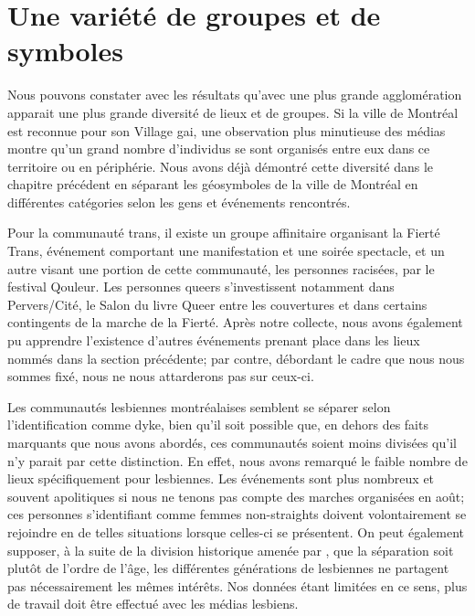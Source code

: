 \section{Une variété de groupes et de symboles}
\label{sec:une_variete_de_groupes_et_de_symboles}
Nous pouvons constater avec les résultats qu'avec une plus grande agglomération apparait une plus grande diversité de lieux et de groupes.
Si la ville de Montréal est reconnue pour son Village gai, une observation plus minutieuse des médias \lgbt montre qu'un grand nombre d'individus se sont organisés entre eux dans ce territoire ou en périphérie.
Nous avons déjà démontré cette diversité dans le chapitre précédent en séparant les géosymboles de la ville de Montréal en différentes catégories selon les gens et événements rencontrés.

Pour la communauté trans, il existe un groupe affinitaire organisant la Fierté Trans, événement comportant une manifestation et une soirée spectacle, et un autre visant une portion de cette communauté, les personnes racisées, par le festival Qouleur.
Les personnes queers s'investissent notamment dans Pervers/Cité, le Salon du livre Queer entre les couvertures et dans certains contingents de la marche de la Fierté. 
Après notre collecte, nous avons également pu apprendre l'existence d'autres événements prenant place dans les lieux nommés dans la section précédente; par contre, débordant le cadre que nous nous sommes fixé, nous ne nous attarderons pas sur ceux-ci.

Les communautés lesbiennes montréalaises semblent se séparer selon l'identification comme dyke, bien qu'il soit possible que, en dehors des faits marquants que nous avons abordés, ces communautés soient moins divisées qu'il n'y parait par cette distinction.
En effet, nous avons remarqué le faible nombre de lieux spécifiquement pour lesbiennes.
Les événements sont plus nombreux et souvent apolitiques si nous ne tenons pas compte des marches organisées en août; ces personnes s'identifiant comme femmes non-straights doivent volontairement se rejoindre en de telles situations lorsque celles-ci se présentent.
On peut également supposer, à la suite de la division historique amenée par \citet{Giraud2014}, que la séparation soit plutôt de l'ordre de l'âge, les différentes générations de lesbiennes ne partagent pas nécessairement les mêmes intérêts.
Nos données étant limitées en ce sens, plus de travail doit être effectué avec les médias lesbiens.


